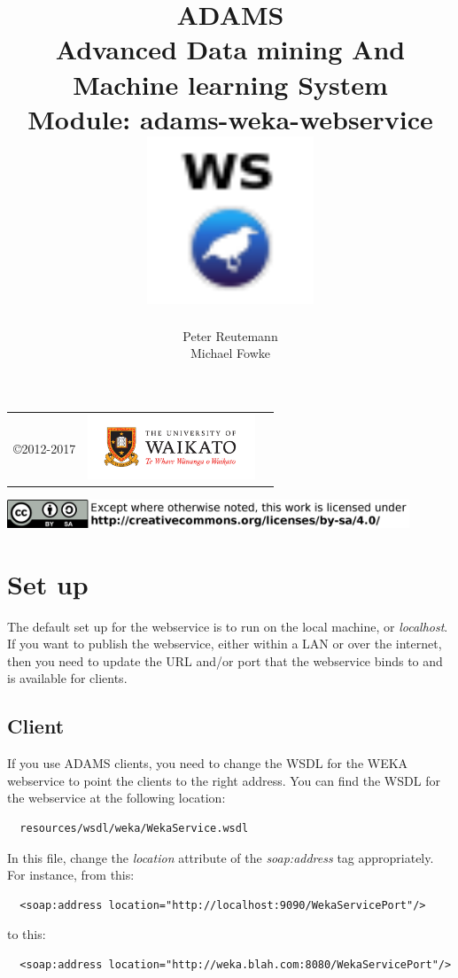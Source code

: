 \documentclass[a4paper]{book}
\title{
  \textbf{ADAMS} \\
  {\Large \textbf{A}dvanced \textbf{D}ata mining \textbf{A}nd \textbf{M}achine
  learning \textbf{S}ystem} \\
  {\Large Module: adams-weka-webservice} \\
  \vspace{1cm}
  \includegraphics[width=5cm]{images/weka-webservice-module.png} \\
}
\author{
  Peter Reutemann \\
  Michael Fowke
}
\begin{document}
\begin{titlepage}
\maketitle

\thispagestyle{empty}
\center
\begin{table}[b]
	\begin{tabular}{c l l}
		\parbox[c][2cm]{2cm}{\copyright 2012-2017} &
		\parbox[c][2cm]{5cm}{\includegraphics[width=5cm]{images/coat_of_arms.pdf}}
	\end{tabular}
	\includegraphics[width=12cm]{images/cc.png} \\
\end{table}

\end{titlepage}

\tableofcontents
\listoffigures

\chapter{Set up}
The default set up for the webservice is to run on the local machine, or
\textit{localhost}. If you want to publish the webservice, either within
a LAN or over the internet, then you need to update the URL and/or port that the 
webservice binds to and is available for clients.

\section{Client}
If you use ADAMS clients, you need to change the WSDL for the WEKA webservice
to point the clients to the right address. You can find the WSDL for the 
webservice at the following location:
\begin{verbatim}
  resources/wsdl/weka/WekaService.wsdl
\end{verbatim}
In this file, change the \textit{location} attribute of the \textit{soap:address} 
tag appropriately. For instance, from this:\
\begin{verbatim}
  <soap:address location="http://localhost:9090/WekaServicePort"/>
\end{verbatim}
to this:
\begin{verbatim}
  <soap:address location="http://weka.blah.com:8080/WekaServicePort"/>
\end{verbatim}
\end{document}
